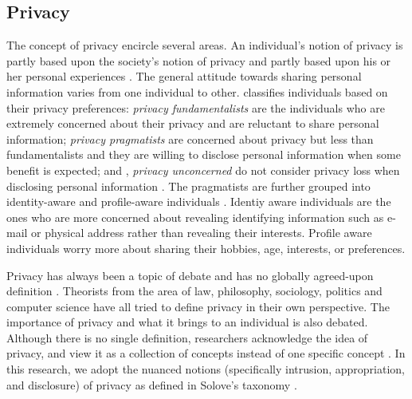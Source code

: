 \documentclass[11pt,          %
               phd,           %
               onehalfspacing %
               ]{ncsuthesis}
\begin{document}
\subsection{Privacy}
The concept of privacy encircle several areas. An individual's notion of
privacy is partly based upon the society's notion of privacy and partly
based upon his or her personal experiences \citep{westin1967privacy,
westin2003social}. The general attitude towards sharing personal
information varies from one individual to other.
\citet{westin1967privacy} classifies individuals based on their privacy
preferences: \textit{privacy fundamentalists} are the individuals who
are extremely concerned about their privacy and are reluctant to share
personal information; \textit{privacy pragmatists} are concerned about
privacy but less than fundamentalists and they are willing to disclose
personal information when some benefit is expected; and ,
\textit{privacy unconcerned} do not consider privacy loss when
disclosing personal information \citep{westin1967privacy}. The
pragmatists are further grouped into identity-aware and profile-aware
individuals \citep{spiekermann2009enggprivacy}. Identiy aware
individuals are the ones who are more concerned about revealing
identifying information such as e-mail or physical address rather than
revealing their interests. Profile aware individuals worry more about
sharing their hobbies, age, interests, or preferences.

Privacy has always been a topic of debate and has no globally
agreed-upon definition \citep{smith2007privacy}. Theorists from the area
of law, philosophy, sociology, politics and computer science have all
tried to define privacy in their own perspective.
%
%
The importance of privacy and what it brings to an individual is also
debated. Although there is no single definition, researchers 
acknowledge the idea of privacy, and view it as a
collection of concepts instead of one specific concept
\citep{smith2007privacy}. In this research, we adopt the nuanced notions
(specifically intrusion, appropriation, and disclosure) of privacy as
defined in Solove's taxonomy \citep{solove-2006-taxonomy}.
\end{document}
